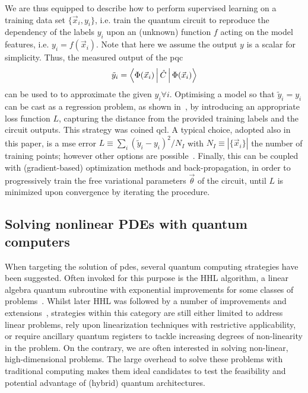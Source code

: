\documentclass[aps,pra,a4paper,twocolumn,longbibliography,groupedaddress]{revtex4-2}
\begin{document}
We are thus equipped to describe how to perform supervised learning on a training data set $\{\vec{x}_i, {y}_i \}$, i.e. train the quantum circuit to reproduce the dependency of the labels ${y}_i$ upon an (unknown) function $f$ acting on the model features, i.e.  ${y}_i = f (\vec{x}_i)$. 
Note that here we assume the output ${y}$ is a scalar for simplicity. Thus, the measured output of the \gls{pqc} 
\begin{equation}
\tilde{y}_i = \Braket{\Phi (\vec{x}_i ) | \hat{C} | \Phi (\vec{x}_i )}
\label{eq:qnn_output}
\end{equation}
can be used to to approximate the given $y_i \forall i$.
Optimising a model so that $\tilde{y}_i = y_i$ can be cast as a regression problem, as shown in~\cite{mitarai2018quantum}, by introducing an appropriate loss function $L$, capturing the distance from the provided training labels and the circuit outputs. This strategy was coined \gls{qcl}. A typical choice, adopted also in this paper, is a \gls{mse} error $L \equiv \sum_i (\tilde{y}_i - y_i)^2/N_I$ with $N_I \equiv |\{\Vec{x}_i\}|$ the number of training points; however other options are possible~\cite{mitarai2018quantum, kyriienko2021solving}. 
Finally, this can be coupled with (gradient-based) optimization methods and back-propagation, in order to progressively train the free variational parameters $\Vec{\theta}$ of the circuit, until $L$ is minimized upon convergence by iterating the procedure. 

\subsection{Solving nonlinear PDEs with quantum computers}\label{subsec:solving_pdes}

When targeting the solution of \gls{pde}s, several quantum computing strategies have been suggested. Often invoked for this purpose is the HHL algorithm, a linear algebra quantum subroutine with exponential improvements for some classes of problems~\cite{harrow2009quantum}. Whilst later HHL was followed by a number of improvements and extensions~\cite{lloyd2020quantum, duan2020surveyhhl}, strategies within this category are still either limited to address linear problems, rely upon linearization techniques with restrictive applicability, or require ancillary quantum registers to tackle increasing degrees of non-linearity in the problem.
On the contrary, we are often interested in solving non-linear, high-dimensional problems. The large overhead to solve these problems with traditional computing makes them ideal candidates to test the feasibility and potential advantage of (hybrid) quantum architectures. 
\end{document}
